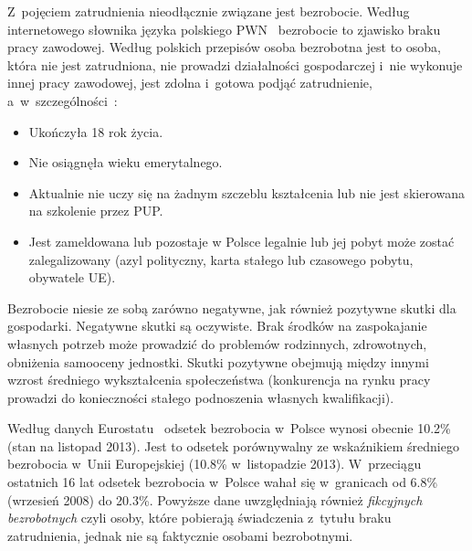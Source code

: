 \documentclass[12pt]{article}
\begin{document}
    Z~pojęciem zatrudnienia nieodłącznie związane jest bezrobocie. Według internetowego słownika języka polskiego PWN~\cite{sjp} bezrobocie to zjawisko braku pracy zawodowej. Według polskich przepisów osoba bezrobotna jest to osoba, która nie jest zatrudniona, nie prowadzi działalności gospodarczej i~nie wykonuje innej pracy zawodowej, jest zdolna i~gotowa podjąć zatrudnienie, a~w~szczególności~\cite{ust:pro:zat}:
    
    \begin{itemize}
        \item Ukończyła 18 rok życia.
        \item Nie osiągnęła wieku emerytalnego.
        \item Aktualnie nie uczy się na żadnym szczeblu kształcenia lub nie jest skierowana na szkolenie przez PUP.
        \item Jest zameldowana lub pozostaje w Polsce legalnie lub jej pobyt może zostać zalegalizowany (azyl polityczny, karta stałego lub czasowego pobytu, obywatele UE).
    \end{itemize}
    
    Bezrobocie niesie ze sobą zarówno negatywne, jak również pozytywne skutki dla gospodarki. Negatywne skutki są oczywiste. Brak środków na zaspokajanie własnych potrzeb może prowadzić do problemów rodzinnych, zdrowotnych, obniżenia samooceny jednostki. Skutki pozytywne obejmują między innymi wzrost średniego wykształcenia społeczeństwa (konkurencja na rynku pracy prowadzi do konieczności stałego podnoszenia własnych kwalifikacji).
    
    Według danych Eurostatu~\cite{eurostat} odsetek bezrobocia w~Polsce wynosi obecnie 10.2\% (stan na listopad 2013). Jest to odsetek porównywalny ze wskaźnikiem średniego bezrobocia w~Unii Europejskiej (10.8\% w~listopadzie 2013). W~przeciągu ostatnich 16 lat odsetek bezrobocia w~Polsce wahał się w~granicach od 6.8\% (wrzesień 2008) do 20.3\%. Powyższe dane uwzględniają również \emph{fikcyjnych bezrobotnych} czyli osoby, które pobierają świadczenia z~tytułu braku zatrudnienia, jednak nie są faktycznie osobami bezrobotnymi.
    
\end{document}
